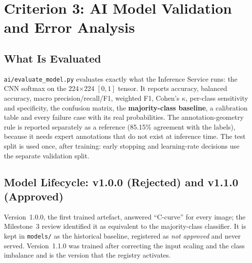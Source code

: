 \documentclass[12pt,a4paper]{article}
\newcommand{\fp}[1]{\nolinkurl{#1}}
\begin{document}
\section{Criterion 3: AI Model Validation and Error Analysis}
\label{sec:c3}

\subsection{What Is Evaluated}

\fp{ai/evaluate_model.py} evaluates exactly what the Inference Service runs: the CNN softmax on the
224$\times$224 $[0,1]$ tensor. It reports accuracy, balanced accuracy, macro precision/recall/F1,
weighted F1, Cohen's $\kappa$, per-class sensitivity and specificity, the confusion matrix, the
\textbf{majority-class baseline}, a calibration table and every failure case with its real
probabilities. The annotation-geometry rule is reported separately as a reference (85.15\% agreement with the labels), because it needs
expert annotations that do not exist at inference time. The test split is used once, after training: early stopping and learning-rate
decisions use the separate validation split.

\subsection{Model Lifecycle: v1.0.0 (Rejected) and v1.1.0 (Approved)}

Version~1.0.0, the first trained artefact, answered ``C-curve'' for every image; the Milestone~3 review identified it as equivalent to
the majority-class classifier. It is kept in \fp{models/} as the historical baseline, registered as \emph{not approved} and
never served. Version~1.1.0 was trained after correcting the input scaling and the class imbalance and is the version that the
registry activates.
\end{document}
